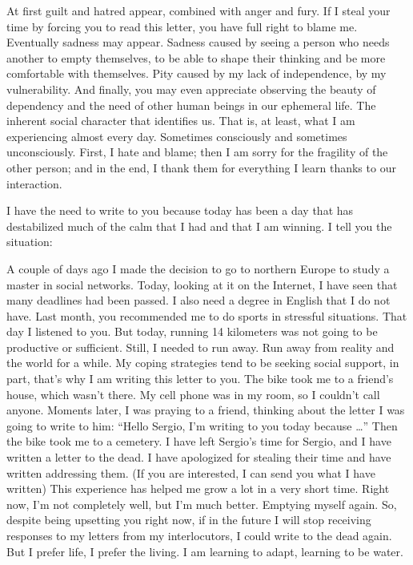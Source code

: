 \documentclass[]{book}
\begin{document}
At first guilt and hatred appear, combined with anger and fury. If I steal your time by forcing you to read this letter, you have full right to blame me. Eventually sadness may appear. Sadness caused by seeing a person who needs another to empty themselves, to be able to shape their thinking and be more comfortable with themselves. Pity caused by my lack of independence, by my vulnerability. And finally, you may even appreciate observing the beauty of dependency and the need of other human beings in our ephemeral life. The inherent social character that identifies us. That is, at least, what I am experiencing almost every day. Sometimes consciously and sometimes unconsciously. First, I hate and blame; then I am sorry for the fragility of the other person; and in the end, I thank them for everything I learn thanks to our interaction.

I have the need to write to you because today has been a day that has destabilized much of the calm that I had and that I am winning. I tell you the situation:

A couple of days ago I made the decision to go to northern Europe to study a master in social networks. Today, looking at it on the Internet, I have seen that many deadlines had been passed. I also need a degree in English that I do not have. Last month, you recommended me to do sports in stressful situations. That day I listened to you. But today, running 14 kilometers was not going to be productive or sufficient. Still, I needed to run away. Run away from reality and the world for a while. My coping strategies tend to be seeking social support, in part, that's why I am writing this letter to you. The bike took me to a friend's house, which wasn't there. My cell phone was in my room, so I couldn't call anyone. Moments later, I was praying to a friend, thinking about the letter I was going to write to him: ``Hello Sergio, I'm writing to you today because \ldots{}'' Then the bike took me to a cemetery. I have left Sergio's time for Sergio, and I have written a letter to the dead. I have apologized for stealing their time and have written addressing them. (If you are interested, I can send you what I have written) This experience has helped me grow a lot in a very short time. Right now, I'm not completely well, but I'm much better. Emptying myself again. So, despite being upsetting you right now, if in the future I will stop receiving responses to my letters from my interlocutors, I could write to the dead again. But I prefer life, I prefer the living. I am learning to adapt, learning to be water.
\end{document}
